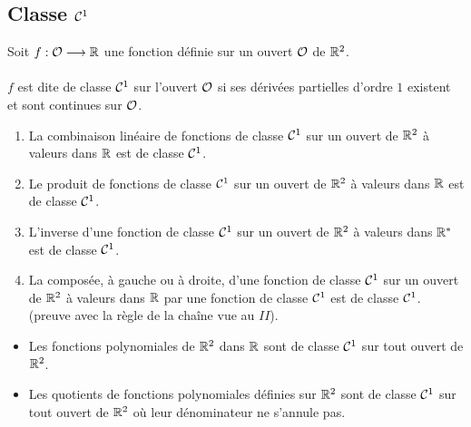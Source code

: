 \subsection{Classe \(\cal{C}^{1}\)}
\begin{defi}
    Soit \(f : \cal{O} \to  \R\) une fonction définie sur un ouvert \(\cal{O}\) de \(\R^2\).\\~\\
    \(f\) est dite de classe \(\cal{C}^{1}\) sur l’ouvert \(\cal{O}\) si ses dérivées partielles d’ordre \(1\) existent et sont continues sur \(\cal{O}\).
\end{defi}
\begin{defprop}
    \begin{enumerate}
        \item La combinaison linéaire de fonctions de classe \( \cal{C}^{1}\) sur un ouvert de \(\R^2\) à valeurs dans \(\R\) est de classe \(\cal{C}^{1}\).
        \item Le produit de fonctions de classe \(\cal{C}^{1}\) sur un ouvert de \(\R^2\) à valeurs dans \(\R\) est de classe \(\cal{C}^{1}\).
        \item L’inverse d’une fonction de classe \(\cal{C}^{1}\) sur un ouvert de \(\R^2\) à valeurs dans \(\Rs\) est de classe \(\cal{C}^{1}\).
        \item La composée, à gauche ou à droite, d’une fonction de classe \(\cal{C}^{1}\) sur un ouvert de \(\R^2\) à valeurs dans \(\R\) par une fonction de classe \(\cal{C}^{1}\) est de classe \(\cal{C}^{1}\). (preuve avec la règle de la chaîne vue au \(II\)).
    \end{enumerate}
\end{defprop}
\begin{ex}
    \begin{itemize}
        \item Les fonctions polynomiales de \(\R^2\) dans \(\R\) sont de classe \(\cal{C}^{1}\) sur tout ouvert de \(\R^2\).
        \item Les quotients de fonctions polynomiales définies sur \(\R^2\) sont de classe \(\cal{C}^{1}\) sur tout ouvert de \(\R^2\) où leur dénominateur ne s’annule pas.
    \end{itemize}
\end{ex}
